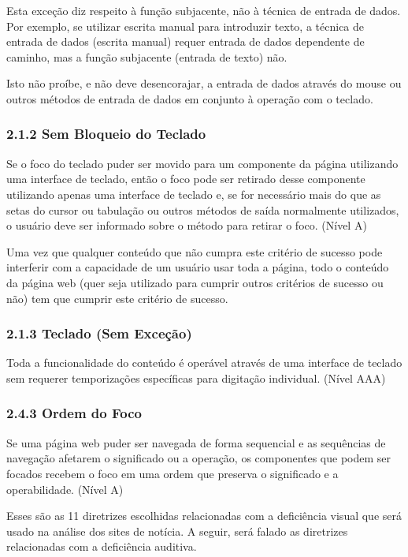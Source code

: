 \documentclass[a4paper]{article}
\begin{document}
\begin{titlepage}
Esta exceção diz respeito à função subjacente, não à técnica de entrada de dados. Por exemplo, se utilizar escrita manual para introduzir texto, a técnica de entrada de dados (escrita manual) requer entrada de dados dependente de caminho, mas a função subjacente (entrada de texto) não.

Isto não proíbe, e não deve desencorajar, a entrada de dados através do mouse ou outros métodos de entrada de dados em conjunto à operação com o teclado.

\subsubsection{2.1.2 Sem Bloqueio do Teclado}

Se o foco do teclado puder ser movido para um componente da página utilizando uma interface de teclado, então o foco pode ser retirado desse componente utilizando apenas uma interface de teclado e, se for necessário mais do que as setas do cursor ou tabulação ou outros métodos de saída normalmente utilizados, o usuário deve ser informado sobre o método para retirar o foco. (Nível A)

Uma vez que qualquer conteúdo que não cumpra este critério de sucesso pode interferir com a capacidade de um usuário usar toda a página, todo o conteúdo da página web (quer seja utilizado para cumprir outros critérios de sucesso ou não) tem que cumprir este critério de sucesso.

\subsubsection{2.1.3 Teclado (Sem Exceção)}

Toda a funcionalidade do conteúdo é operável através de uma interface de teclado sem requerer temporizações específicas para digitação individual. (Nível AAA)

\subsubsection{2.4.3 Ordem do Foco}

Se uma página web puder ser navegada de forma sequencial e as sequências de navegação afetarem o significado ou a operação, os componentes que podem ser focados recebem o foco em uma ordem que preserva o significado e a operabilidade. (Nível A)

Esses são as 11 diretrizes escolhidas relacionadas com a deficiência visual que será usado na análise dos sites de notícia. A seguir, será falado as diretrizes relacionadas com a deficiência auditiva.


\end{titlepage}
\end{document}
